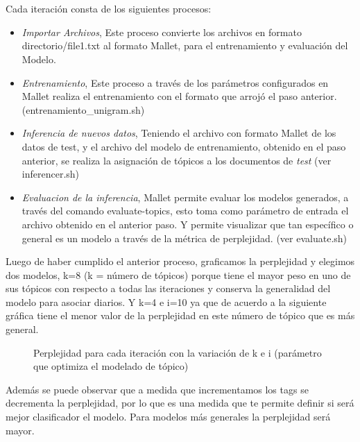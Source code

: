 \documentclass[8.5pt,twoside,twocolumn]{article}
\begin{document}
\\
\\
Cada iteraci\'on consta de los siguientes procesos:
\begin{itemize}
\item \emph{Importar Archivos},
            Este proceso convierte los archivos 
            en formato directorio/file1.txt  al formato Mallet, para el 
            entrenamiento y evaluaci\'on del Modelo. 
\item \emph{Entrenamiento},
            Este proceso a trav\'es de los par\'ametros 
            configurados en Mallet realiza el entrenamiento 
            con el formato que arroj\'o el paso anterior. (entrenamiento\_unigram.sh)
\item \emph{Inferencia de nuevos datos},
            Teniendo el archivo con formato Mallet de los datos de test, 
            y el archivo del modelo de entrenamiento, obtenido en el paso anterior, 
            se realiza la asignaci\'on de t\'opicos a los documentos de \emph{test} (ver inferencer.sh)
            
\item \emph{Evaluacion de la inferencia},
            Mallet permite evaluar los modelos generados, a trav\'es del comando 
            evaluate-topics, esto toma como par\'ametro de entrada el archivo obtenido en 
            el anterior paso. Y permite visualizar que tan espec\'ifico o general es un modelo
            a trav\'es de la m\'etrica de perplejidad. (ver evaluate.sh)
\end{itemize}

Luego de haber cumplido el anterior proceso, graficamos la perplejidad y
 elegimos dos modelos, k=8 (k = n\'umero de t\'opicos) porque tiene  el mayor peso en uno de sus 
t\'opicos con respecto a todas las iteraciones y conserva la generalidad del modelo para asociar diarios.
 Y k=4 e i=10 ya que de acuerdo a la siguiente
 gr\'afica tiene el menor valor de la perplejidad en este n\'umero de t\'opico que es  m\'as general.

\begin{figure}[h]
  \centering
  \caption{Perplejidad para cada iteraci\'on con la variaci\'on de k e i (par\'ametro que optimiza el modelado de t\'opico) } 
  \label{fgr:perplexity}
\end{figure}

Adem\'as se puede observar que a medida que incrementamos los tags se decrementa la perplejidad, 
por lo que es una medida que te permite definir si ser\'a mejor clasificador el modelo.
Para modelos m\'as generales la perplejidad  ser\'a mayor.
\end{document}
